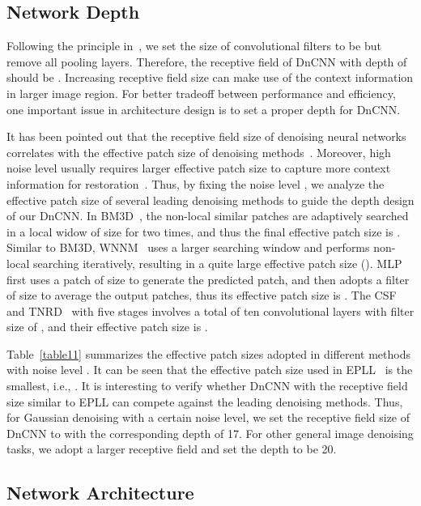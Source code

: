 \documentclass[journal]{IEEEtran}
\begin{document}
\subsection{Network Depth}

Following the principle in~\cite{simonyan2014very}, we set the size of convolutional filters to be  but remove all pooling layers. Therefore, the receptive field of DnCNN with depth of  should be . Increasing receptive field size can make use of the context information in larger image region. For better tradeoff between performance and efficiency, one important issue in architecture design is to set a proper depth for DnCNN.

It has been pointed out that the receptive field size of denoising neural networks correlates with the effective patch size of denoising methods~\cite{jain2009natural,burger2012image}. Moreover, high noise level usually requires larger effective patch size to capture more context information for restoration~\cite{levin2011natural}. Thus, by fixing the noise level , we analyze the effective patch size of several leading denoising methods to guide the depth design of our DnCNN. In BM3D~\cite{dabov2007image}, the non-local similar patches are adaptively searched in a local widow of size  for two times, and thus the final effective patch size is . Similar to BM3D, WNNM~\cite{gu2014weighted} uses a larger searching window and performs non-local searching iteratively, resulting in a quite large effective patch size (). MLP~\cite{burger2012image} first uses a patch of size  to generate the predicted patch, and then adopts a filter of size  to average the output patches, thus its effective patch size is . The CSF~\cite{schmidt2014shrinkage} and TNRD~\cite{chen2015trainable} with five stages involves a total of ten convolutional layers with filter size of , and their effective patch size is .

Table~\ref{table11} summarizes the effective patch sizes adopted in different methods with noise level .
It can be seen that the effective patch size used in EPLL~\cite{zoran2011learning} is the smallest, i.e., . It is interesting to verify whether DnCNN with the receptive field size similar to EPLL can compete against the leading denoising methods. Thus, for Gaussian denoising with a certain noise level, we set the receptive field size of DnCNN to  with the corresponding depth of 17. For other general image denoising tasks, we adopt a larger receptive field and set the depth to be 20.


\subsection{Network Architecture}
\end{document}
